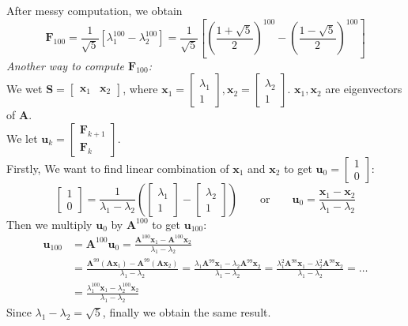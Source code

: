 After messy computation, we obtain 
\[
\bm F_{100}=\frac{1}{\sqrt{5}}\left[\lambda_1^{100}-\lambda_2^{100}\right]
=\frac{1}{\sqrt{5}}\left[\left(\frac{1+\sqrt{5}}{2}\right)^{100}-\left(\frac{1-\sqrt{5}}{2}\right)^{100}\right]
\]
\emph{Another way to compute $\bm F_{100}$:}\\
We wet $\bm S=\begin{bmatrix}
\bm x_1&\bm x_2
\end{bmatrix}$, where $\bm x_1=\begin{bmatrix}
\lambda_1\\1
\end{bmatrix},\bm x_2=\begin{bmatrix}
\lambda_2\\1
\end{bmatrix}.$ $\bm x_1,\bm x_2$ are eigenvectors of $\bm A$.\\
We let $\bm u_k=\begin{bmatrix}
\bm F_{k+1}\\\bm F_{k}
\end{bmatrix}$.\\
Firstly, We want to find linear combination of $\bm x_1$ and $\bm x_2$ to get $\bm u_0=\begin{bmatrix}
1\\0
\end{bmatrix}$:
\[
\begin{bmatrix}
1\\0
\end{bmatrix}=\frac{1}{\lambda_1-\lambda_2}\left(\begin{bmatrix}
\lambda_1\\1
\end{bmatrix}-\begin{bmatrix}
\lambda_2\\1
\end{bmatrix}\right)\qquad
\text{or}\qquad
\bm u_0=\frac{\bm x_1-\bm x_2}{\lambda_1-\lambda_2}
\]
Then we multiply $\bm u_{0}$ by $\bm A^{100}$ to get $\bm u_{100}$:
\begin{align*}
\bm u_{100}&=\bm A^{100}\bm u_0=\frac{\bm A^{100}\bm x_1-\bm A^{100}\bm x_2}{\lambda_1-\lambda_2}\\
&=\frac{\bm A^{99}(\bm A\bm x_1)-\bm A^{99}(\bm A\bm x_2)}{\lambda_1-\lambda_2}=\frac{\lambda_1\bm A^{99}\bm x_1-\lambda_2\bm A^{99}\bm x_2}{\lambda_1-\lambda_2}=\frac{\lambda_1^2\bm A^{98}\bm x_1-\lambda_2^2\bm A^{98}\bm x_2}{\lambda_1-\lambda_2}=\dots\\
&=\frac{\lambda_1^{100}\bm x_1-\lambda_2^{100}\bm x_2}{\lambda_1-\lambda_2}
\end{align*}
Since $\lambda_1-\lambda_2=\sqrt{5}$, finally we obtain the same result.
